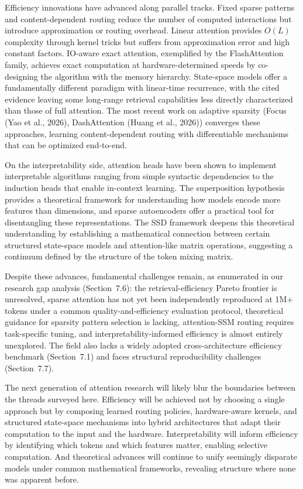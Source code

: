\documentclass[10pt,twocolumn]{article}
\begin{document}
Efficiency innovations have advanced along parallel tracks. Fixed sparse patterns and content-dependent routing reduce the number of computed interactions but introduce approximation or routing overhead. Linear attention provides $O(L)$ complexity through kernel tricks but suffers from approximation error and high constant factors. IO-aware exact attention, exemplified by the FlashAttention family, achieves exact computation at hardware-determined speeds by co-designing the algorithm with the memory hierarchy. State-space models offer a fundamentally different paradigm with linear-time recurrence, with the cited evidence leaving some long-range retrieval capabilities less directly characterized than those of full attention. The most recent work on adaptive sparsity (Focus (Yao et al., 2026), DashAttention (Huang et al., 2026)) converges these approaches, learning content-dependent routing with differentiable mechanisms that can be optimized end-to-end.

On the interpretability side, attention heads have been shown to implement interpretable algorithms ranging from simple syntactic dependencies to the induction heads that enable in-context learning. The superposition hypothesis provides a theoretical framework for understanding how models encode more features than dimensions, and sparse autoencoders offer a practical tool for disentangling these representations. The SSD framework deepens this theoretical understanding by establishing a mathematical connection between certain structured state-space models and attention-like matrix operations, suggesting a continuum defined by the structure of the token mixing matrix.

Despite these advances, fundamental challenges remain, as enumerated in our research gap analysis (Section~7.6): the retrieval-efficiency Pareto frontier is unresolved, sparse attention has not yet been independently reproduced at 1M+ tokens under a common quality-and-efficiency evaluation protocol, theoretical guidance for sparsity pattern selection is lacking, attention-SSM routing requires task-specific tuning, and interpretability-informed efficiency is almost entirely unexplored. The field also lacks a widely adopted cross-architecture efficiency benchmark (Section~7.1) and faces structural reproducibility challenges (Section~7.7).

The next generation of attention research will likely blur the boundaries between the threads surveyed here. Efficiency will be achieved not by choosing a single approach but by composing learned routing policies, hardware-aware kernels, and structured state-space mechanisms into hybrid architectures that adapt their computation to the input and the hardware. Interpretability will inform efficiency by identifying which tokens and which features matter, enabling selective computation. And theoretical advances will continue to unify seemingly disparate models under common mathematical frameworks, revealing structure where none was apparent before.
\end{document}
